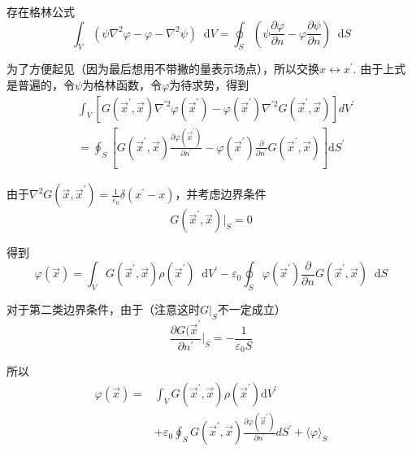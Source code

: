 \documentclass[UTF8]{ctexart}
\newcommand*{\dif}{\mathop{}\!\mathrm{d}}
\begin{document}
    存在格林公式
    \begin{equation}
        \int_V (\psi \nabla^2 \varphi - \varphi - \nabla^2 \psi)\dif V = \oint_S \left(\psi \frac{\partial \varphi}{\partial n} - \varphi \frac{\partial \psi}{\partial n}\right) \dif S
    \end{equation}

\noindent 为了方便起见（因为最后想用不带撇的量表示场点），所以交换$x \leftrightarrow x^{\prime}$. 由于上式是普遍的，令$\psi$为格林函数，令$\varphi$为待求势，得到
\begin{equation}
    \begin{aligned}
        &\int_{V}\left[G\left(\vec{x}^{\prime}, \vec{x}\right) \nabla^{\prime 2} \varphi\left(\vec{x}^{\prime}\right)-\varphi\left(\vec{x}^{\prime}\right) \nabla^{\prime 2} G\left(\vec{x}^{\prime}, \vec{x}\right)\right] d V^{\prime}\\
        &=\oint_{S}\left[G\left(\vec{x}^{\prime}, \vec{x}\right) \frac{\partial \varphi\left(\vec{x}^{\prime}\right)}{\partial n^{\prime}}-\varphi\left(\vec{x}^{\prime}\right) \frac{\partial}{\partial n^{\prime}} G\left(\vec{x}^{\prime}, \vec{x}\right)\right] \mathrm{d} S^{\prime}
        \end{aligned}
\end{equation}

\noindent 由于$\nabla^2 G(\vec{x},\vec{x}^{\prime}) = \frac{1}{\varepsilon_0} \delta(x^{\prime}-x)$，并考虑边界条件
\begin{equation}
    G(\vec{x}^{\prime},\vec{x})|_S = 0
\end{equation}

\noindent 得到 
\begin{equation}
    \varphi(\vec{x}) = \int_V G(\vec{x}^{\prime},\vec{x})\rho(\vec{x}^{\prime})\dif V^{\prime} - \varepsilon_0 \oint_S \varphi(\vec{x}^{\prime})\frac{\partial}{\partial n} G(\vec{x}^{\prime},\vec{x})\dif S
\end{equation}

    对于第二类边界条件，由于（注意这时$G|_S$不一定成立）
    \begin{equation}
        \frac{\partial G(\vec{x}^{\prime}}{\partial n^{\prime}}|_S = - \frac{1}{\varepsilon_0 S}
    \end{equation}

\noindent 所以
\begin{equation}
    \begin{aligned}
        \varphi(\vec{x})=& \int_{V} G\left(\vec{x}^{\prime}, \vec{x}\right) \rho\left(\vec{x}^{\prime}\right) \mathrm{d} V^{\prime} \\
        &+\varepsilon_{0} \oint_{S} G\left(\vec{x}^{\prime}, \vec{x}\right) \frac{\partial \varphi\left(\vec{x}^{\prime}\right)}{\partial n^{\prime}} d S^{\prime}+\langle\varphi\rangle_{S}
        \end{aligned}
\end{equation}
\end{document}
